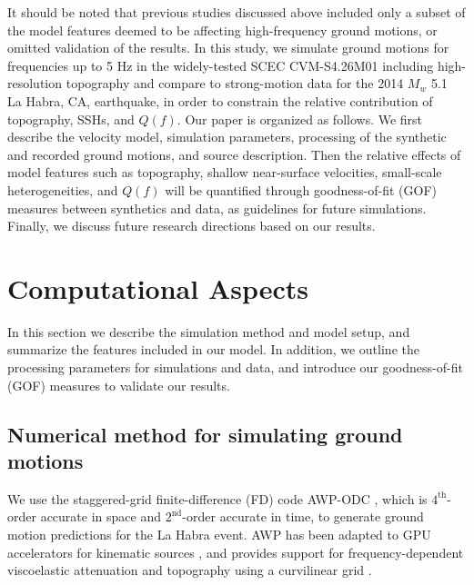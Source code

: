 It should be noted that previous studies discussed above included only a subset of the model features deemed to be affecting high-frequency ground motions, or omitted validation of the results. In this study, we simulate ground motions for frequencies up to 5 Hz in the widely-tested SCEC CVM-S4.26M01 including high-resolution topography and compare to strong-motion data for the 2014 $M_w$ 5.1 La Habra, CA, earthquake, in order to constrain the relative contribution of topography, SSHs, and $Q(f)$. Our paper is organized as follows. We first describe the velocity model, simulation parameters, processing of the synthetic and recorded ground motions, and source description. Then the relative effects of model features such as topography, shallow near-surface velocities, small-scale heterogeneities, and $Q(f)$ will be quantified through goodness-of-fit (GOF) measures between synthetics and data, as guidelines for future simulations. Finally, we discuss future research directions based on our results.



\section{Computational Aspects}\label{approach}

In this section we describe the simulation method and model setup, and summarize the features included in our model. In addition, we outline the processing parameters for simulations and data, and introduce our goodness-of-fit (GOF) measures to validate our results.

\subsection{Numerical method for simulating ground motions}
We use the staggered-grid finite-difference (FD) code AWP-ODC \citep[Anelastic Wave Propagation, Olsen-Day-Cui, from the authors of the code, hereafter denoted by AWP;][]{cuiScalableEarthquakeSimulation2010}, which is $4^{\text{th}}$-order accurate in space and $2^{\text{nd}}$-order accurate in time, to generate ground motion predictions for the La Habra event. AWP has been adapted to GPU accelerators for kinematic sources \citep{cui2013physics}, and provides support for frequency-dependent viscoelastic attenuation \citep{withersMemoryEfficientSimulation2015} and topography using a curvilinear grid \citep{oreillyHighorderFiniteDifference2021}. 

